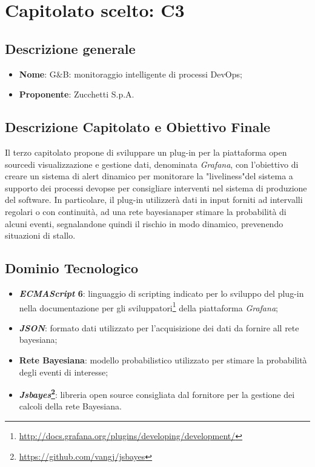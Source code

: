 \section{Capitolato scelto: C3}\label{CapScelto}

\subsection{Descrizione generale}
\begin{itemize}
	\item \textbf{Nome}: G$\&$B: monitoraggio intelligente di processi DevOps;
	\item \textbf{Proponente}: Zucchetti S.p.A.
\end{itemize}

\subsection{Descrizione Capitolato e Obiettivo Finale}
Il terzo capitolato propone di sviluppare un plug-in per la piattaforma open source\glossario di visualizzazione e gestione dati, denominata \textit{Grafana}, con l'obiettivo di creare un sistema di alert dinamico per monitorare la "liveliness"\glossario del sistema a supporto dei processi
devops\glossario e per consigliare interventi nel sistema di produzione del software.
In particolare, il plug-in utilizzerà dati in input forniti ad intervalli regolari o con continuità, ad una rete bayesiana\glossario per stimare la probabilità di alcuni eventi, segnalandone quindi il rischio in modo dinamico, prevenendo situazioni di stallo.   

\subsection{Dominio Tecnologico}
\begin{itemize}
	\item \textbf{\textit{ECMAScript} 6\glossario}: linguaggio di scripting indicato per lo sviluppo del plug-in nella documentazione per gli sviluppatori\footnote{\url{http://docs.grafana.org/plugins/developing/development/}} della piattaforma \textit{Grafana};
	\item \textbf{\textit{JSON}\glossario}: formato dati utilizzato per l'acquisizione dei dati da fornire all rete bayesiana;
	\item \textbf{Rete Bayesiana}: modello probabilistico utilizzato per stimare la probabilità degli eventi di interesse;
	\item \textbf{\textit{Jsbayes}\footnote{\hyperref[Link al repository GitHub]{\url{https://github.com/vangj/jsbayes}}}\glossario}: libreria open source consigliata dal fornitore per la gestione dei calcoli della rete Bayesiana.
\end{itemize}

